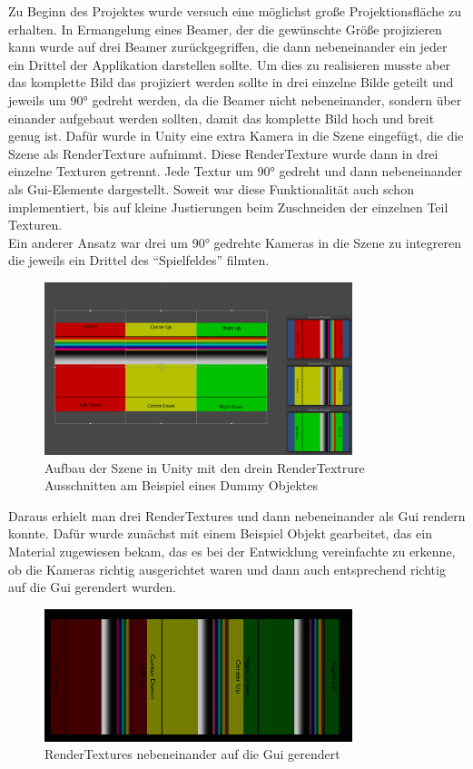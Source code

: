 
Zu Beginn des Projektes wurde versuch eine möglichst große Projektionsfläche zu erhalten. In Ermangelung eines Beamer, der die gewünschte Größe projizieren kann wurde auf drei Beamer zurückgegriffen, die dann nebeneinander ein jeder ein Drittel der Applikation darstellen sollte. Um dies zu realisieren musste aber das komplette Bild das projiziert werden sollte in drei einzelne Bilde geteilt und jeweils um 90° gedreht werden, da die Beamer nicht nebeneinander, sondern über einander aufgebaut werden sollten, damit das komplette Bild hoch und breit genug ist. Dafür wurde in Unity eine extra Kamera in die Szene eingefügt, die die Szene als RenderTexture aufnimmt. Diese RenderTexture wurde dann in drei einzelne Texturen getrennt. Jede Textur um 90° gedreht und dann nebeneinander als Gui-Elemente dargestellt. Soweit war diese Funktionalität auch schon implementiert, bis auf kleine Justierungen beim Zuschneiden der einzelnen Teil Texturen. \\
Ein anderer Ansatz war drei um 90° gedrehte Kameras in die Szene zu integreren die jeweils ein Drittel des "`Spielfeldes"' filmten. 
\begin{figure}[h]
	\centering
		\includegraphics[width=0.8\textwidth]{images/RenderTextureBeispielSzene.PNG}
	\caption{Aufbau der Szene in Unity mit den drein RenderTextrure Ausschnitten am Beispiel eines Dummy Objektes}
	\label{fig:RenderTextureBeispielSzene}
\end{figure}
Daraus erhielt man drei RenderTextures und dann nebeneinander als Gui rendern konnte. Dafür wurde zunächst mit einem Beispiel Objekt gearbeitet, das ein Material zugewiesen bekam, das es bei der Entwicklung vereinfachte zu erkenne, ob die Kameras richtig ausgerichtet waren und dann auch entsprechend richtig auf die Gui gerendert wurden. 
\begin{figure}[h]
	\centering
		\includegraphics[width=0.8\textwidth]{images/RenderTexturesAlsGui.PNG}
	\caption{RenderTextures nebeneinander auf die Gui gerendert}
	\label{fig:RenderTexturesAlsGui}
\end{figure}\\
